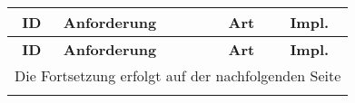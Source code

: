 \begin{longtable}{|c|l|c|c|}

    \hline
    \textbf{ID}          &
    \textbf{Anforderung} &
    \textbf{Art}         &
    \textbf{Impl.}                                                                                              \\ \hline
    \endfirsthead

    \hline
    \textbf{ID}          & \textbf{Anforderung}                                 & \textbf{Art} & \textbf{Impl.} \\
    \hline
    \endhead

    \hline
    \multicolumn{4}{|r|}{{Die Fortsetzung erfolgt auf der nachfolgenden Seite}}                                 \\
    \hline
    \endfoot

    \endlastfoot


\end{longtable}
